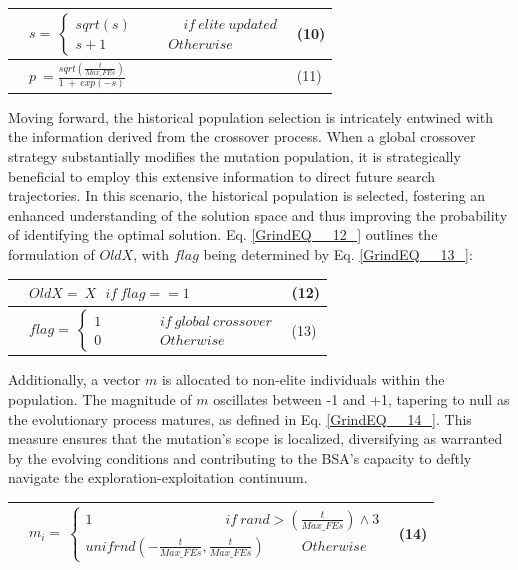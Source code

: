 \documentclass{article} %
\begin{document}
\begin{tabular}{|p{0.4in}|p{2.9in}|p{0.5in}|} \hline 
 & $s=\ \left\{ \begin{array}{c}
sqrt(s)\ \ \ \ \ \ \ \ \ \ \ \ \ \ \ \ \ if\ elite\ updated \\ 
s+1\ \ \ \ \ \ \ \ \ \ \ \ \ \ \ \ \ \ \ \ Otherwise \end{array}
\right.$ & (10) \\ \hline 
 & $p\ =\frac{sqrt\left(\frac{t}{Max\_FEs}\right)}{1\ +\ exp\left(-s\right)}$ & (11) \\ \hline 
\end{tabular}

Moving forward, the historical population selection is intricately entwined with the information derived from the crossover process. When a global crossover strategy substantially modifies the mutation population, it is strategically beneficial to employ this extensive information to direct future search trajectories. In this scenario, the historical population is selected, fostering an enhanced understanding of the solution space and thus improving the probability of identifying the optimal solution. Eq. \eqref{GrindEQ__12_} outlines the formulation of $OldX$, with $flag$ being determined by Eq. \eqref{GrindEQ__13_}:

\begin{tabular}{|p{0.4in}|p{2.9in}|p{0.5in}|} \hline 
 & $OldX=\ X\ \ \ if\ flag==1$ & (12) \\ \hline 
 & $flag=\ \left\{ \begin{array}{c}
1\ \ \ \ \ \ \ \ \ \ \ \ \ \ \ \ \ \ \ if\ global\ crossover \\ 
0\ \ \ \ \ \ \ \ \ \ \ \ \ \ \ \ \ \ \ Otherwise \end{array}
\right.$ & (13) \\ \hline 
\end{tabular}

 Additionally, a vector $m$ is allocated to non-elite individuals within the population. The magnitude of $m$ oscillates between -1 and +1, tapering to null as the evolutionary process matures, as defined in Eq. \eqref{GrindEQ__14_}. This measure ensures that the mutation's scope is localized, diversifying as warranted by the evolving conditions and contributing to the BSA's capacity to deftly navigate the exploration-exploitation continuum.

\begin{tabular}{|p{0.3in}|p{3.4in}|p{0.3in}|} \hline 
 & $m_i=\ \left\{ \begin{array}{c}
1\ \ \ \ \ \ \ \ \ \ \ \ \ \ \ \ \ \ \ \ \ \ \ \ \ \ \ \ \ \ \ \ \ \ \ \ \ \ \ \ \ \ \ if\ rand>\left(\frac{t}{Max\_FEs}\right)\wedge 3 \\ 
unifrnd(-\frac{t}{Max\_FEs},\frac{t}{Max\_FEs})\ \ \ \ \ \ \ \ \ \ \ \ Otherwise \end{array}
\right.$ & (14) \\ \hline 
\end{tabular}
\end{document}
